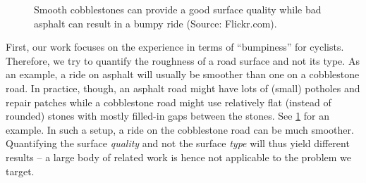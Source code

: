 \begin{figure}[t]
    \centering
    \hfill
    \caption{%
        Smooth cobblestones can provide a good surface quality while bad asphalt can result in a bumpy ride (Source: Flickr.com).
    }%
    \label{fig:cobblestone_vs_asphalt}
\end{figure}

First, our work focuses on the experience in terms of ``bumpiness'' for cyclists.
Therefore, we try to quantify the roughness of a road surface and not its type.
As an example, a ride on asphalt will usually be smoother than one on a cobblestone road.
In practice, though, an asphalt road might have lots of (small) potholes and repair patches while a cobblestone road might use relatively flat (instead of rounded) stones  with mostly filled-in gaps between the stones.
See \cref{fig:cobblestone_vs_asphalt} for an example.
In such a setup, a ride on the cobblestone road can be much smoother.
Quantifying the surface \emph{quality} and not the surface \emph{type} will thus yield different results -- a large body of related work is hence not applicable to the problem we target.

